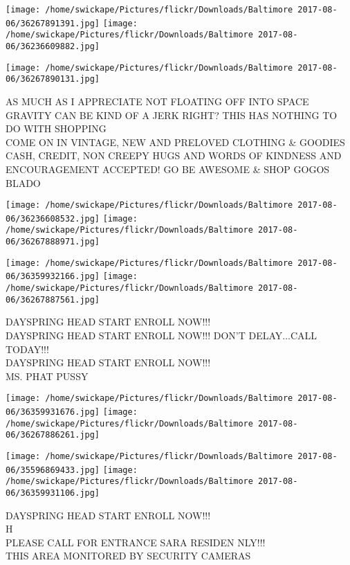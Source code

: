 \documentclass[10pt,letterpaper]{article}
\begin{document}
\texttt{[image: /home/swickape/Pictures/flickr/Downloads/Baltimore 2017-08-06/36267891391.jpg]}
\texttt{[image: /home/swickape/Pictures/flickr/Downloads/Baltimore 2017-08-06/36236609882.jpg]}

\vspace{0.25in}
\texttt{[image: /home/swickape/Pictures/flickr/Downloads/Baltimore 2017-08-06/36267890131.jpg]}

AS MUCH AS I APPRECIATE NOT FLOATING OFF INTO SPACE GRAVITY CAN BE KIND OF A JERK RIGHT?  THIS HAS NOTHING TO DO WITH SHOPPING\\
COME ON IN VINTAGE, NEW AND PRELOVED CLOTHING \& GOODIES CASH, CREDIT, NON CREEPY HUGS AND WORDS OF KINDNESS AND ENCOURAGEMENT ACCEPTED!  GO BE AWESOME \& SHOP GOGOS\\
BLADO\\
\pagebreak

\texttt{[image: /home/swickape/Pictures/flickr/Downloads/Baltimore 2017-08-06/36236608532.jpg]}
\texttt{[image: /home/swickape/Pictures/flickr/Downloads/Baltimore 2017-08-06/36267888971.jpg]}

\texttt{[image: /home/swickape/Pictures/flickr/Downloads/Baltimore 2017-08-06/36359932166.jpg]}
\texttt{[image: /home/swickape/Pictures/flickr/Downloads/Baltimore 2017-08-06/36267887561.jpg]}

DAYSPRING HEAD START ENROLL NOW!!!\\
DAYSPRING HEAD START ENROLL NOW!!!  DON'T DELAY...CALL TODAY!!!\\
DAYSPRING HEAD START ENROLL NOW!!!\\
MS. PHAT PUSSY\\
\pagebreak

\texttt{[image: /home/swickape/Pictures/flickr/Downloads/Baltimore 2017-08-06/36359931676.jpg]}
\texttt{[image: /home/swickape/Pictures/flickr/Downloads/Baltimore 2017-08-06/36267886261.jpg]}

\texttt{[image: /home/swickape/Pictures/flickr/Downloads/Baltimore 2017-08-06/35596869433.jpg]}
\texttt{[image: /home/swickape/Pictures/flickr/Downloads/Baltimore 2017-08-06/36359931106.jpg]}

DAYSPRING HEAD START ENROLL NOW!!!\\
H\\
PLEASE CALL FOR ENTRANCE SARA RESIDEN NLY!!!\\
THIS AREA MONITORED BY SECURITY CAMERAS\\
\pagebreak
\end{document}
